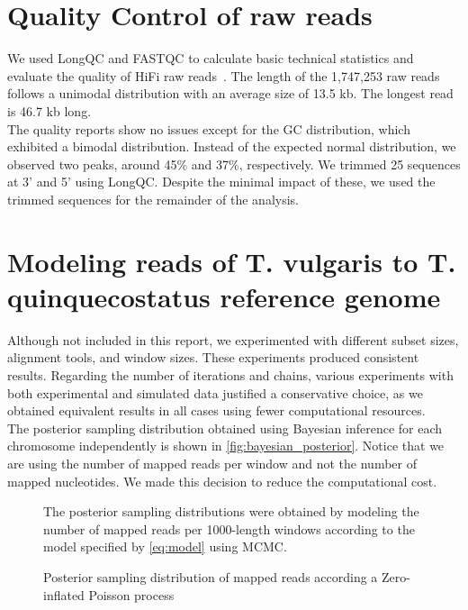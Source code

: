\section*{Quality Control of raw reads}

We used LongQC and FASTQC to calculate basic technical statistics and evaluate the quality of \ac{HiFi} raw reads~\cite{fukasawaLongQCQualityControl2020,BabrahamBioinformaticsFastQC}. The length of the 1,747,253 raw reads follows a unimodal distribution with an average size of 13.5 kb. The longest read is 46.7 kb long. \\

The quality reports show no issues except for the GC distribution, which exhibited a bimodal distribution. Instead of the expected normal distribution, we observed two peaks, around 45\%  and 37\%, respectively. We trimmed 25 sequences at 3' and 5' using LongQC. Despite the minimal impact of these, we used the trimmed sequences for the remainder of the analysis. \\

\section*{Modeling reads of T. vulgaris to T. quinquecostatus reference genome}

Although not included in this report, we experimented with different subset sizes, alignment tools, and window sizes. These experiments produced consistent results. Regarding the number of iterations and chains, various experiments with both experimental and simulated data justified a conservative choice, as we obtained equivalent results in all cases using fewer computational resources. \\

The posterior sampling distribution obtained using Bayesian inference for each chromosome independently is shown in \autoref{fig:bayesian_posterior}. Notice that we are using the number of mapped reads per window and not the number of mapped nucleotides. We made this decision to reduce the computational cost. \\

\graphicspath{{gfx/}}
\begin{figure}
\begin{center}
    
    \caption{Posterior sampling distribution of mapped reads according a Zero-inflated Poisson process}    
    \label{fig:bayesian_posterior}    
\end{center}
\footnotesize
The posterior sampling distributions were obtained by modeling the number of mapped reads per 1000-length windows according to the model specified by \eqref{eq:model} using \ac{MCMC}.   
\end{figure}    

